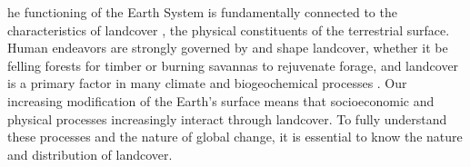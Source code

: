 \documentclass{pnastwo}
\begin{document}
\begin{article}
\begin{abstract}
{%
}
\end{abstract}


\linenumbers

he functioning of the Earth System is fundamentally connected to the characteristics of landcover \cite{lambin_modelling_1997}, the physical constituents of the terrestrial surface. Human endeavors are strongly governed by and shape landcover, whether it be felling forests for timber or burning savannas to rejuvenate forage, and landcover is a primary factor in many climate and biogeochemical processes \cite{lambin_dynamics_2003}. Our increasing modification of the Earth's surface \cite{lambin_dynamics_2003} means that socioeconomic and physical processes increasingly interact through landcover. To fully understand these processes and the nature of global change, it is essential to know the nature and distribution of landcover.  


\end{article}
\end{document}
